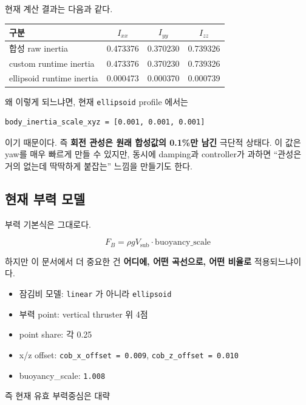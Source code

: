 \documentclass[11pt,a4paper]{article}
\newcommand{\code}[1]{\nolinkurl{#1}}
\begin{document}
현재 계산 결과는 다음과 같다.

\begin{center}
\small
\begin{tabular}{lccc}
\toprule
구분 & $I_{xx}$ & $I_{yy}$ & $I_{zz}$ \\
\midrule
합성 raw inertia & 0.473376 & 0.370230 & 0.739326 \\
custom runtime inertia & 0.473376 & 0.370230 & 0.739326 \\
ellipsoid runtime inertia & 0.000473 & 0.000370 & 0.000739 \\
\bottomrule
\end{tabular}
\end{center}

왜 이렇게 되느냐면, 현재 \code{ellipsoid} profile 에서는

\begin{verbatim}
body_inertia_scale_xyz = [0.001, 0.001, 0.001]
\end{verbatim}

이기 때문이다. 즉 \textbf{회전 관성은 원래 합성값의 0.1\%만 남긴} 극단적 상태다. 이 값은 yaw를 매우 빠르게 만들 수 있지만, 동시에 damping과 controller가 과하면 ``관성은 거의 없는데 딱딱하게 붙잡는'' 느낌을 만들기도 한다.

\subsection{현재 부력 모델}

부력 기본식은 그대로다.

\begin{equation}
F_B = \rho g V_{\mathrm{sub}} \cdot \mathrm{buoyancy\_scale}
\end{equation}

하지만 이 문서에서 더 중요한 건 \textbf{어디에, 어떤 곡선으로, 어떤 비율로} 적용되느냐이다.

\begin{itemize}[leftmargin=2em]
  \item 잠김비 모델: \code{linear} 가 아니라 \code{ellipsoid}
  \item 부력 point: vertical thruster 위 4점
  \item point share: 각 0.25
  \item x/z offset: \code{cob\_x\_offset = 0.009}, \code{cob\_z\_offset = 0.010}
  \item buoyancy\_scale: \code{1.008}
\end{itemize}

즉 현재 유효 부력중심은 대략
\end{document}
